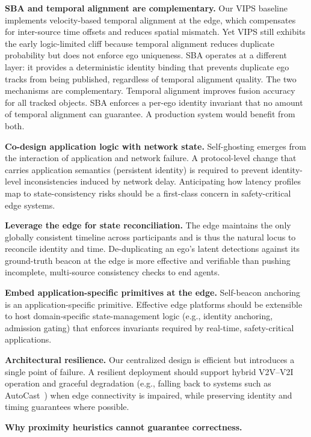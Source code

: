 \smallskip\noindent\textbf{SBA and temporal alignment are complementary.}
Our VIPS baseline implements velocity-based temporal alignment at the edge, which compensates for inter-source time offsets and reduces spatial mismatch. Yet VIPS still exhibits the early logic-limited cliff because temporal alignment reduces duplicate probability but does not enforce ego uniqueness. SBA operates at a different layer: it provides a deterministic identity binding that prevents duplicate ego tracks from being published, regardless of temporal alignment quality. The two mechanisms are complementary. Temporal alignment improves fusion accuracy for all tracked objects. SBA enforces a per-ego identity invariant that no amount of temporal alignment can guarantee. A production system would benefit from both.

\smallskip\noindent\textbf{Co-design application logic with network state.}
Self-ghosting emerges from the interaction of application and network failure. A protocol-level change that carries application semantics (persistent identity) is required to prevent identity-level inconsistencies induced by network delay. Anticipating how latency profiles map to state-consistency risks should be a first-class concern in safety-critical edge systems.

\smallskip\noindent\textbf{Leverage the edge for state reconciliation.}
The edge maintains the only globally consistent timeline across participants and is thus the natural locus to reconcile identity and time. De-duplicating an ego's latent detections against its ground-truth beacon at the edge is more effective and verifiable than pushing incomplete, multi-source consistency checks to end agents.

\smallskip\noindent\textbf{Embed application-specific primitives at the edge.}
Self-beacon anchoring is an application-specific primitive. Effective edge platforms should be extensible to host domain-specific state-management logic (e.g., identity anchoring, admission gating) that enforces invariants required by real-time, safety-critical applications.

\smallskip\noindent\textbf{Architectural resilience.}
Our centralized design is efficient but introduces a single point of failure. A resilient deployment should support hybrid V2V–V2I operation and graceful degradation (e.g., falling back to systems such as AutoCast~\cite{Autocast}) when edge connectivity is impaired, while preserving identity and timing guarantees where possible.

\smallskip\noindent\textbf{Why proximity heuristics cannot guarantee correctness.}

